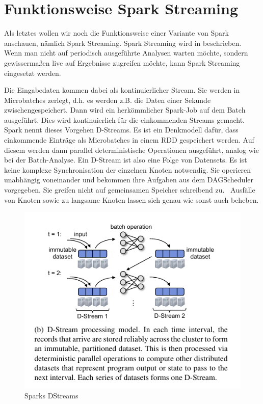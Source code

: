 \section[Funktionsweise Spark
Streaming]{\rmfamily Funktionsweise Spark
Streaming}
Als letztes wollen wir noch die Funktionsweise einer Variante von Spark
anschauen, nämlich Spark Streaming. Spark Streaming wird in \cite{SparkStreaming} beschrieben.
 Wenn man nicht auf periodisch
ausgeführte Analysen warten möchte, sondern gewissermaßen live auf
Ergebnisse zugreifen möchte, kann Spark Streaming eingesetzt werden.

Die Eingabedaten kommen dabei als kontinuierlicher Stream. Sie werden in
Microbatches zerlegt, d.h. es werden z.B. die Daten einer Sekunde
zwischengespeichert. Dann wird ein herkömmlicher Spark-Job auf dem
Batch ausgeführt. Dies wird kontinuierlich für die einkommenden Streams
gemacht. Spark nennt dieses Vorgehen D-Streams. Es ist ein Denkmodell
dafür, dass einkommende Einträge als Microbatches in einem RDD
gespeichert werden. Auf diesem werden dann parallel deterministische
Operationen ausgeführt, analog wie bei der Batch-Analyse. Ein D-Stream
ist also eine Folge von Datensets. Es ist keine komplexe
Synchronisation der einzelnen Knoten notwendig. Sie operieren
unabhängig voneinander und bekommen ihre Aufgaben aus dem DAGScheduler
vorgegeben. Sie greifen nicht auf gemeinsamen Speicher schreibend zu.
\ Ausfälle von Knoten sowie zu langsame Knoten lassen sich genau wie
sonst auch beheben. 

\begin{figure}
\centering
\includegraphics[width=\textwidth]{bilder/Seminartext-img4.png}
\caption{Sparks DStreams \cite{SparkStreaming}}
\end{figure}
